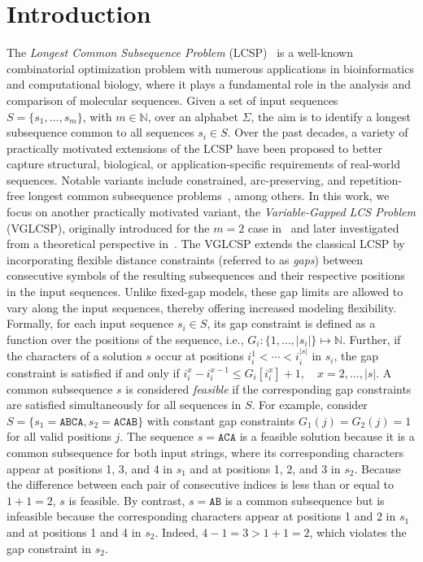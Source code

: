 \documentclass[runningheads]{llncs}
\begin{document}
	\section{Introduction}
	
	The \textit{Longest Common Subsequence Problem} (LCSP)~\cite{DJUKANOVIC2020106499,bergroth2000survey} is a well-known combinatorial optimization problem with numerous applications in bioinformatics and computational biology, where it plays a fundamental role in the analysis and comparison of molecular sequences. Given a set of input sequences $S=\{s_1,\ldots,s_m\}$, with $m \in \mathbb{N}$, over an alphabet $\Sigma$, the aim is to identify a longest subsequence common to all sequences $s_i \in S$. Over the past decades, a variety of practically motivated extensions of the LCSP have been proposed to better capture structural, biological, or application-specific requirements of real-world sequences. Notable variants include constrained, arc-preserving, and repetition-free longest common subsequence problems~\cite{jiang2004longest,farhana2015constrained,adi2010repetition}, among others. In this work, we focus on another practically motivated variant, the \textit{Variable-Gapped LCS Problem} (VGLCSP), originally introduced for the $m=2$ case in~\cite{penga2011longest} and later investigated from a theoretical perspective in~\cite{adamson2023longest}. The VGLCSP extends the classical LCSP by incorporating flexible distance constraints (referred to as \emph{gaps}) between consecutive symbols of the resulting subsequences and their respective positions in the input sequences. Unlike fixed-gap models, these gap limits are allowed to vary along the input sequences, thereby offering increased modeling flexibility.\\
	Formally, for each input sequence $s_i \in S$, its gap constraint is defined as a function over the  positions of the sequence, i.e., $
	G_i \colon \{1,\ldots,|s_i|\} \mapsto \mathbb{N}.$ Further, if the characters of a solution $s$ occur at positions
	$i^1_i < \cdots < i^{|s|}_i$ in $s_i$, the gap constraint is satisfied if and only if $
	i^x_i - i^{x-1}_i \leq G_i[i^x_i] + 1, \quad x = 2,\ldots,|s|.$ A common subsequence $s$ is considered \emph{feasible} if the corresponding gap constraints are satisfied simultaneously for all sequences in $S$. For example, consider $S=\{s_1=\texttt{ABCA}, s_2=\texttt{ACAB}\}$ with constant gap constraints $G_1(j)=G_2(j)=1$ for all valid positions $j$. The sequence $s=\texttt{ACA}$ is a feasible solution because it is a common subsequence for both input strings, where its corresponding characters appear at positions 1, 3, and 4 in $s_1$ and at positions 1, 2, and 3 in $s_2$. Because the difference between each pair of consecutive indices is less than or equal to $1+1=2$, $s$ is feasible.  By contrast, $s=\texttt{AB}$ is a common subsequence but is infeasible because the corresponding characters appear at positions 1 and 2 in $s_1$ and at positions 1 and 4 in $s_2$. Indeed, $4-1=3>1+1=2$, which violates the gap constraint in $s_2$. \\ 
\end{document}
